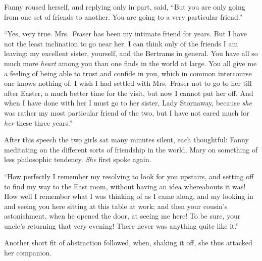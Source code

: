 \documentclass{article}
\begin{document}
Fanny roused herself, and replying only in part, said,
``But you are only going from one set of friends to another.
You are going to a very particular friend.''

``Yes, very true.  Mrs.\ Fraser has been my intimate friend
for years.  But I have not the least inclination to go
near her.  I can think only of the friends I am leaving:
my excellent sister, yourself, and the Bertrams in general.
You have all so much more \emph{heart} among you than one
finds in the world at large.  You all give me a feeling
of being able to trust and confide in you, which in common
intercourse one knows nothing of.  I wish I had settled
with Mrs.\ Fraser not to go to her till after Easter, a much
better time for the visit, but now I cannot put her off.
And when I have done with her I must go to her sister,
Lady Stornaway, because \emph{she} was rather my most particular
friend of the two, but I have not cared much for \emph{her}
these three years.''

After this speech the two girls sat many minutes silent,
each thoughtful:  Fanny meditating on the different sorts
of friendship in the world, Mary on something of less
philosophic tendency.  \emph{She} first spoke again.

``How perfectly I remember my resolving to look for
you upstairs, and setting off to find my way to the
East room, without having an idea whereabouts it was!
How well I remember what I was thinking of as I came along,
and my looking in and seeing you here sitting at this
table at work; and then your cousin's astonishment,
when he opened the door, at seeing me here!  To be sure,
your uncle's returning that very evening!  There never
was anything quite like it.''

Another short fit of abstraction followed, when,
shaking it off, she thus attacked her companion.
\end{document}
